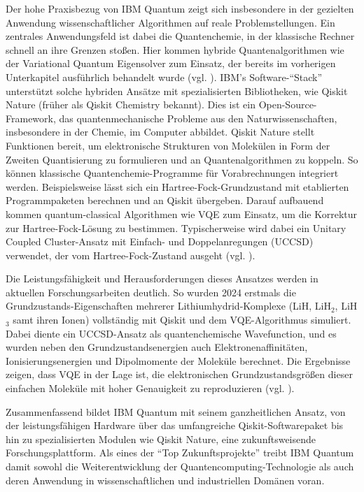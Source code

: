 Der hohe Praxisbezug von IBM Quantum zeigt sich insbesondere in der gezielten Anwendung wissenschaftlicher Algorithmen auf reale Problemstellungen. Ein zentrales Anwendungsfeld ist dabei die Quantenchemie, in der klassische Rechner schnell an ihre Grenzen stoßen. Hier kommen hybride Quantenalgorithmen wie der Variational Quantum Eigensolver zum Einsatz, der bereits im vorherigen Unterkapitel ausführlich behandelt wurde (vgl.  \cite{miceliQuantumComputationVisualization2018}). IBM’s Software-“Stack” unterstützt solche hybriden Ansätze mit spezialisierten Bibliotheken, wie Qiskit Nature (früher als Qiskit Chemistry bekannt). Dies ist ein Open-Source-Framework, das quantenmechanische Probleme aus den Naturwissenschaften, insbesondere in der Chemie, im Computer abbildet. Qiskit Nature stellt Funktionen bereit, um elektronische Strukturen von Molekülen in Form der Zweiten Quantisierung zu formulieren und an Quantenalgorithmen zu koppeln. So können klassische Quantenchemie-Programme für Vorabrechnungen integriert werden. Beispielsweise lässt sich ein Hartree-Fock-Grundzustand mit etablierten Programmpaketen berechnen und an Qiskit übergeben. Darauf aufbauend kommen quantum-classical Algorithmen wie VQE zum Einsatz, um die Korrektur zur Hartree-Fock-Lösung zu bestimmen. Typischerweise wird dabei ein Unitary Coupled Cluster-Ansatz mit Einfach- und Doppelanregungen (UCCSD) verwendet, der vom Hartree-Fock-Zustand ausgeht (vgl. \cite{avramidisGroundStateProperty2024}).

\vspace{0.5em}

Die Leistungsfähigkeit und Herausforderungen dieses Ansatzes werden in aktuellen Forschungsarbeiten deutlich. So wurden 2024 erstmals die Grundzustands-Eigenschaften mehrerer Lithiumhydrid-Komplexe (LiH, LiH$_2$, LiH$_3$ samt ihren Ionen) vollständig mit Qiskit und dem VQE-Algorithmus simuliert. Dabei diente ein UCCSD-Ansatz als quantenchemische Wavefunction, und es wurden neben den Grundzustandsenergien auch Elektronenaffinitäten, Ionisierungsenergien und Dipolmomente der Moleküle berechnet. Die Ergebnisse zeigen, dass VQE in der Lage ist, die elektronischen Grundzustandsgrößen dieser einfachen Moleküle mit hoher Genauigkeit zu reproduzieren (vgl. \cite{avramidisGroundStateProperty2024}).

\vspace{0.5em}

Zusammenfassend bildet IBM Quantum mit seinem ganzheitlichen Ansatz, von der leistungsfähigen Hardware über das umfangreiche Qiskit-Softwarepaket bis hin zu spezialisierten Modulen wie Qiskit Nature, eine zukunftsweisende Forschungsplattform. Als eines der “Top Zukunftsprojekte” treibt IBM Quantum damit sowohl die Weiterentwicklung der Quantencomputing-Technologie als auch deren Anwendung in wissenschaftlichen und industriellen Domänen voran.

